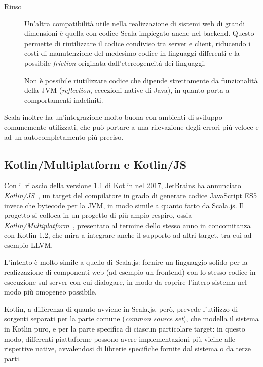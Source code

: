 \begin{description}
        \item[Riuso]
          Un'altra compatibilità utile nella realizzazione di sistemi web di grandi dimensioni è quella con codice Scala impiegato anche nel backend.
          Questo permette di riutilizzare il codice condiviso tra server e client,
          riducendo i costi di manutenzione del medesimo codice in linguaggi differenti e la possibile \emph{friction} originata dall'etereogeneità dei linguaggi.

          Non è possibile riutilizzare codice che dipende strettamente da funzionalità della JVM (\emph{reflection}, eccezioni native di Java), in quanto porta a comportamenti indefiniti.
      \end{description}

      Scala inoltre ha un'integrazione molto buona con ambienti di sviluppo comunemente utilizzati, che può portare a una rilevazione degli errori più veloce e ad un autocompletamento più preciso.

    \subsection{Kotlin/Multiplatform e Kotlin/JS}\label{subsec:kotlinjs}
      Con il rilascio della versione 1.1 di Kotlin nel 2017, JetBrains ha annunciato \emph{Kotlin/JS}~\cite{Belov2017}, un target del compilatore in grado di generare codice JavaScript ES5 invece che bytecode per la JVM, in modo simile a quanto fatto da Scala.js.
      Il progetto si colloca in un progetto di più ampio respiro, ossia \emph{Kotlin/Multiplatform}~\cite{Jemerov2017}, presentato al termine dello stesso anno in concomitanza con Kotlin 1.2, che mira a integrare anche il supporto ad altri target, tra cui ad esempio LLVM\@.

      L'intento è molto simile a quello di Scala.js:
      fornire un linguaggio solido per la realizzazione di componenti web (ad esempio un frontend) con lo stesso codice in esecuzione sul server con cui dialogare, in modo da coprire l'intero sistema nel modo più omogeneo possibile.

      Kotlin, a differenza di quanto avviene in Scala.js, però, prevede l'utilizzo di sorgenti separati per la parte comune (\emph{common source set}), che modella il sistema in Kotlin puro, e per la parte specifica di ciascun particolare target:
      in questo modo, differenti piattaforme possono avere implementazioni più vicine alle rispettive native, avvalendosi di librerie specifiche fornite dal sistema o da terze parti.

